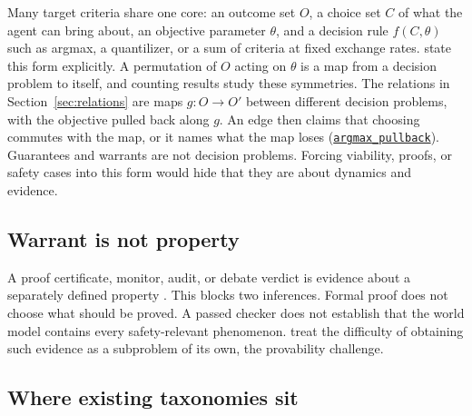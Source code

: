\documentclass[11pt]{article}
\newcommand{\lean}[1]{\hyperref[lean:#1]{\nolinkurl{#1}}}
\begin{document}
Many target criteria share one core: an outcome set $O$, a choice set $C$ of what the agent can bring about, an objective parameter $\theta$, and a decision rule $f(C,\theta)$ such as argmax, a quantilizer, or a sum of criteria at fixed exchange rates.
\textcite{turner2022retargetable} state this form explicitly.
A permutation of $O$ acting on $\theta$ is a map from a decision problem to itself, and counting results study these symmetries.
The relations in Section~\ref{sec:relations} are maps $g:O\to O'$ between different decision problems, with the objective pulled back along $g$.
An edge then claims that choosing commutes with the map, or it names what the map loses (\lean{argmax_pullback}).
Guarantees and warrants are not decision problems.
Forcing viability, proofs, or safety cases into this form would hide that they are about dynamics and evidence.

\subsection{Warrant is not property}

A proof certificate, monitor, audit, or debate verdict is evidence about a separately defined property \parencite{necula1997pcc,dalrymple2024gsai}.
This blocks two inferences.
Formal proof does not choose what should be proved.
A passed checker does not establish that the world model contains every safety-relevant phenomenon.
\textcite{harris2026taxonomy} treat the difficulty of obtaining such evidence as a subproblem of its own, the provability challenge.

\subsection{Where existing taxonomies sit}
\label{sec:taxonomies-placed}
\end{document}
